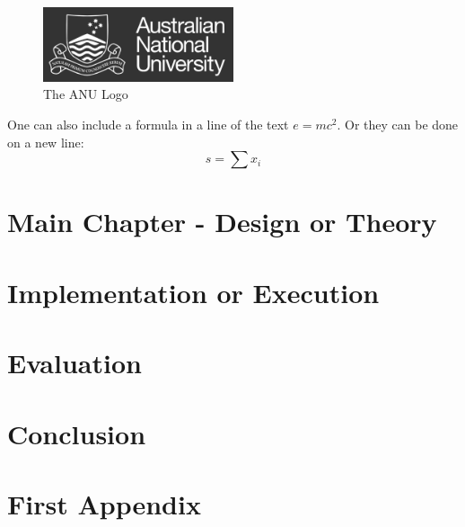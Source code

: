 \documentclass[pdftex,twoside,a4paper]{report}
\begin{document}
\begin{figure}
\begin{center}
\includegraphics[width=0.5\textwidth]{logo.png}
\end{center}
\caption{The ANU Logo} \label{anulog}
\end{figure}


One can also include a formula in a line of the text $e=mc^2$.  Or they can be done on a new line:
\[ s = \sum x_i \]



\chapter{Main Chapter - Design or Theory}

\chapter{Implementation or Execution}

\chapter{Evaluation}

\chapter{Conclusion}

	
	

\appendix
\chapter{First Appendix}
\end{document}
